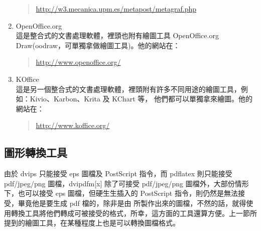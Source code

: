 \begin{enumerate}
        \begin{quote}
          \url{http://w3.mecanica.upm.es/metapost/metagraf.php}
        \end{quote}

  \item {\sffamily OpenOffice.org}\\
        這是整合式的文書處理軟體，裡頭也附有繪圖工具 {\sffamily OpenOffice.org Draw}({\ttfamily oodraw}，可單獨拿做繪圖工具)。他的網站在：

        \begin{quote}
          \url{http://www.openoffice.org/}
        \end{quote}

  \item {\sffamily KOffice}\\
        這是另一個整合式的文書處理軟體，裡頭附有許多不同用途的繪圖工具，例如：{\sffamily Kivio}、{\sffamily Karbon}、{\sffamily Krita} 及 {\sffamily KChart} 等， 他們都可以單獨拿來繪圖。他的網站在：

        \begin{quote}
          \url{http://www.koffice.org/}
        \end{quote}
\end{enumerate}

\subsection{圖形轉換工具}

由於 {\ttfamily dvips} 只能接受 eps 圖檔及 {\sc PostScript} 指令，而 {\ttfamily pdflatex} 則只能接受 pdf/jpeg/png 圖檔，{\ttfamily dvipdfm[x]} 除了可接受 pdf/jpeg/png 圖檔外，大部份情形下，也可以接受 eps 圖檔，但硬生生插入的 {\sc PostScript} 指令，則仍然是無法接受，畢竟他是要生成 pdf 檔的，除非是由 \MP{} 所製作出來的圖檔，不然的話，就得使用轉換工具將他們轉成可被接受的格式，所幸，這方面的工具還算方便。上一節所提到的繪圖工具，在某種程度上也是可以轉換圖檔格式。

